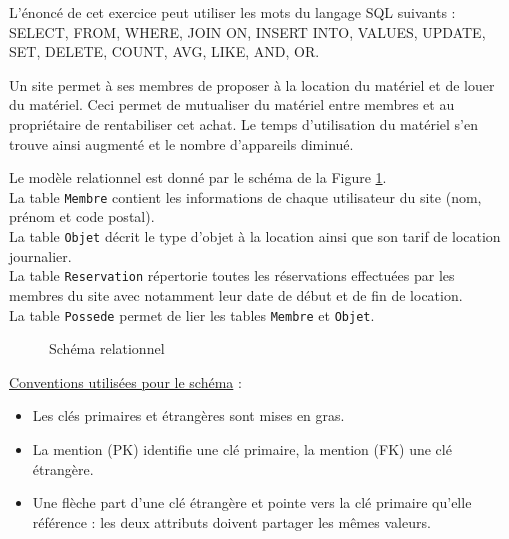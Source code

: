 \documentclass[a4paper, noanswers, addpoints, 12pt]{exam}
\newcommand{\sql}[1] {\textsc{#1}}
\begin{document}
\noindent L'énoncé de cet exercice peut utiliser les mots du langage \sql{SQL} suivants :
\sql{SELECT}, \sql{FROM}, \sql{WHERE}, \sql{JOIN ON}, \sql{INSERT INTO}, \sql{VALUES}, \sql{UPDATE}, \sql{SET}, \sql{DELETE}, \sql{COUNT}, \sql{AVG}, \sql{LIKE}, \sql{AND}, \sql{OR}.

\medskip
 
\noindent Un site permet à ses membres de proposer à la location du matériel et de louer du  matériel. Ceci permet de mutualiser du matériel entre membres et au propriétaire de rentabiliser cet achat. Le temps d'utilisation du matériel s'en trouve ainsi augmenté et le nombre d'appareils diminué.

\newpage

\noindent Le modèle relationnel est donné par le schéma de la Figure \ref{fig:schena-relationnel}.\\

La table {\tt Membre} contient les informations de chaque utilisateur du site (nom, prénom et code postal).\\

La table {\tt Objet} décrit le type d'objet à la location ainsi que son tarif de location journalier.\\

La table {\tt Reservation} répertorie toutes les réservations effectuées par les membres du site avec notamment leur date de début et de fin de location.\\

La table {\tt Possede} permet de lier les tables {\tt Membre} et {\tt Objet}.

\begin{figure}[h]
    \begin{center}
    
    \end{center}
    \caption{Schéma relationnel}
    \label{fig:schena-relationnel}
\end{figure}

\noindent \underline{Conventions utilisées pour le schéma} :

\begin{itemize}
 \item Les clés primaires et étrangères sont mises en gras.
 \item La mention (PK) identifie une clé primaire, la mention (FK) une clé étrangère.
 \item Une flèche part d'une clé étrangère et pointe vers la clé primaire qu'elle référence : les deux attributs doivent partager les mêmes valeurs.
\end{itemize}
\end{document}
